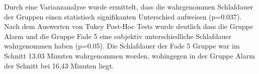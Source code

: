 Durch eine Varianzanalyse wurde ermittelt, dass die wahrgenommen Schlafdauer der Gruppen einen statistisch signifikanten Unterschied aufweisen (p=0.037). Nach dem Auswerten von Tukey Post-Hoc Tests wurde deutlich dass die Gruppe Alarm und die Gruppe Fade 5 eine subjektiv unterschiedliche Schlafdauer wahrgenommen haben (p=0.05). Die Schlafdauer der Fade 5 Gruppe war im Schnitt 13,03 Minuten wahrgenommen worden, wohingegen in der Gruppe Alarm der Schnitt bei 16,43 Minuten liegt. 

